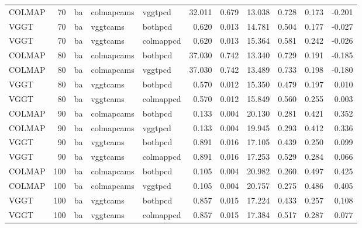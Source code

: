 \begin{table}[H]
\begin{tabular}{lrlllrrrrrr}
COLMAP & 70 & ba & colmapcams & vggtpcd & 32.011 & 0.679 & 13.038 & 0.728 & 0.173 & -0.201 \\
VGGT & 70 & ba & vggtcams & bothpcd & 0.620 & 0.013 & 14.781 & 0.504 & 0.177 & -0.027 \\
VGGT & 70 & ba & vggtcams & colmappcd & 0.620 & 0.013 & 15.364 & 0.581 & 0.242 & -0.026 \\
COLMAP & 80 & ba & colmapcams & bothpcd & 37.030 & 0.742 & 13.340 & 0.729 & 0.191 & -0.185 \\
COLMAP & 80 & ba & colmapcams & vggtpcd & 37.030 & 0.742 & 13.489 & 0.733 & 0.198 & -0.180 \\
VGGT & 80 & ba & vggtcams & bothpcd & 0.570 & 0.012 & 15.350 & 0.479 & 0.197 & 0.010 \\
VGGT & 80 & ba & vggtcams & colmappcd & 0.570 & 0.012 & 15.849 & 0.560 & 0.255 & 0.003 \\
COLMAP & 90 & ba & colmapcams & bothpcd & 0.133 & 0.004 & 20.130 & 0.281 & 0.421 & 0.352 \\
COLMAP & 90 & ba & colmapcams & vggtpcd & 0.133 & 0.004 & 19.945 & 0.293 & 0.412 & 0.336 \\
VGGT & 90 & ba & vggtcams & bothpcd & 0.891 & 0.016 & 17.105 & 0.439 & 0.250 & 0.099 \\
VGGT & 90 & ba & vggtcams & colmappcd & 0.891 & 0.016 & 17.253 & 0.529 & 0.284 & 0.066 \\
COLMAP & 100 & ba & colmapcams & bothpcd & 0.105 & 0.004 & 20.982 & 0.260 & 0.497 & 0.425 \\
COLMAP & 100 & ba & colmapcams & vggtpcd & 0.105 & 0.004 & 20.757 & 0.275 & 0.486 & 0.405 \\
VGGT & 100 & ba & vggtcams & bothpcd & 0.857 & 0.015 & 17.224 & 0.433 & 0.257 & 0.108 \\
VGGT & 100 & ba & vggtcams & colmappcd & 0.857 & 0.015 & 17.384 & 0.517 & 0.287 & 0.077 \\
\bottomrule
\end{tabular}
\end{table}
